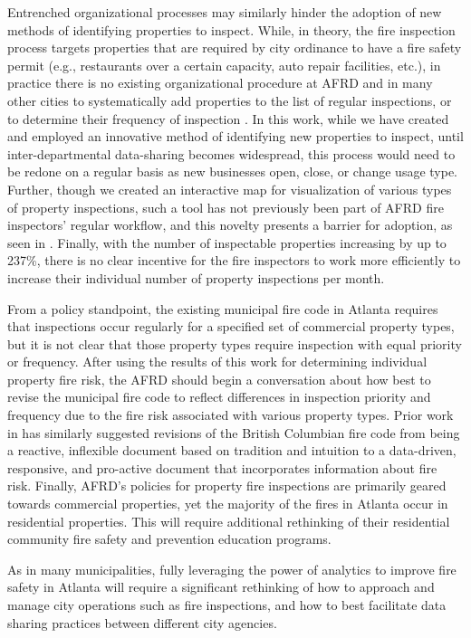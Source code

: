 \documentclass{sig-alternate-05-2015}
\begin{document}
{Entrenched organizational processes may similarly hinder the adoption of new methods of identifying properties to inspect. While, in theory, the fire inspection process targets properties that are required by city ordinance to have a fire safety permit (e.g., restaurants over a certain capacity, auto repair facilities, etc.), in practice there is no existing organizational procedure at AFRD and in many other cities to systematically add properties to the list of regular inspections, or to determine their frequency of inspection \cite{garis14}. In this work, while we have created and employed an innovative method of identifying new properties to inspect, until inter-departmental data-sharing becomes widespread, this process would need to be redone on a regular basis as new businesses open, close, or change usage type. Further, though we created an interactive map for visualization of various types of property inspections, such a tool has not previously been part of AFRD fire inspectors' regular workflow, and this novelty presents a barrier for adoption, as seen in \cite{dobrica12}. Finally, with the number of inspectable properties increasing by up to 237\%, there is no clear incentive for the fire inspectors to work more efficiently to increase their individual number of property inspections per month.

From a policy standpoint, the existing municipal fire code in Atlanta requires that inspections occur regularly for a specified set of commercial property types, but it is not clear that those property types require inspection with equal priority or frequency. After using the results of this work for determining individual property fire risk, the AFRD should begin a conversation about how best to revise the municipal fire code to reflect differences in inspection priority and frequency due to the fire risk associated with various property types. Prior work in \cite{garis14} has similarly suggested revisions of the British Columbian fire code from being a reactive, inflexible document based on tradition and intuition to a data-driven, responsive, and pro-active document that incorporates information about fire risk. Finally, AFRD's policies for property fire inspections are primarily geared towards commercial properties, yet the majority of the fires in Atlanta occur in residential properties. This will require additional rethinking of their residential community fire safety and prevention education programs.
 
As in many municipalities, fully leveraging the power of analytics to improve fire safety in Atlanta will require a significant rethinking of how to approach and manage city operations such as fire inspections, and how to best facilitate data sharing practices between different city agencies. 


}
\end{document}

